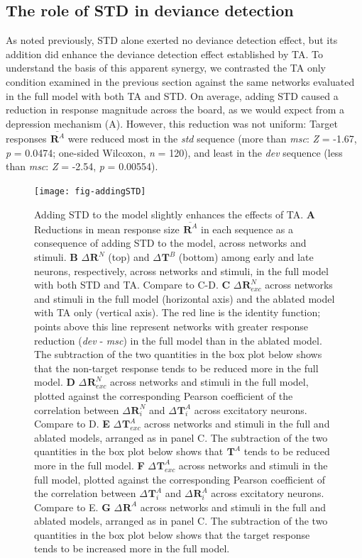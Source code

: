 \documentclass[9pt,lineno,onehalfspacing]{elife}
\newcommand{\dev}{\textit{dev}}
\newcommand{\msc}{\textit{msc}}
\newcommand{\std}{\textit{std}}
\newcommand{\R}[3][]{{}^{#1}_{}\boldsymbol R^{#2}_{#3}}
\newcommand{\T}[3][]{{}^{#1}_{}\boldsymbol T^{#2}_{#3}}
\newcommand{\mean}[1]{\overline{#1}}
\begin{document}
\subsection{The role of STD in deviance detection}\label{sec:std}

As noted previously, STD alone exerted no deviance detection effect, but its addition did enhance the deviance detection effect established by TA. To understand the basis of this apparent synergy, we contrasted the TA only condition examined in the previous section against the same networks evaluated in the full model with both TA and STD. On average, adding STD caused a reduction in response magnitude across the board, as we would expect from a depression mechanism (A). However, this reduction was not uniform: Target responses $\mean{\R{A}{}}$ were reduced most in the \std{} sequence (more than \msc{}: \textit{Z} = -1.67, \textit{p} = 0.0474; one-sided Wilcoxon, \textit{n} = 120), and least in the \dev{} sequence (less than \msc{}: \textit{Z} = -2.54, \textit{p} = 0.00554).

\begin{figure}
    \texttt{[image: fig-addingSTD]}
    \caption{%
        Adding STD to the model slightly enhances the effects of TA.
        \textbf{A} Reductions in mean response size $\mean{\R{A}{}}$ in each sequence as a consequence of adding STD to the model, across networks and stimuli.
        \textbf{B} $\Delta \R{N}{}$ (top) and $\Delta \T{B}{}$ (bottom) among early and late neurons, respectively, across networks and stimuli, in the full model with both STD and TA. Compare to C-D.
        \textbf{C} $\Delta \R{N}{exc}$ across networks and stimuli in the full model (horizontal axis) and the ablated model with TA only (vertical axis). The red line is the identity function; points above this line represent networks with greater response reduction (\dev{} - \msc{}) in the full model than in the ablated model. The subtraction of the two quantities in the box plot below shows that the non-target response tends to be reduced more in the full model.
        \textbf{D} $\Delta \R{N}{exc}$ across networks and stimuli in the full model, plotted against the corresponding Pearson coefficient of the correlation between $\Delta \R{N}{i}$ and $\Delta \T{A}{i}$ across excitatory neurons. Compare to D.
        \textbf{E} $\Delta \T{A}{exc}$ across networks and stimuli in the full and ablated models, arranged as in panel C. The subtraction of the two quantities in the box plot below shows that $\T{A}{}$ tends to be reduced more in the full model.
        \textbf{F} $\Delta \T{A}{exc}$ across networks and stimuli in the full model, plotted against the corresponding Pearson coefficient of the correlation between $\Delta \T{A}{i}$ and $\Delta \R{A}{i}$ across excitatory neurons. Compare to E.
        \textbf{G} $\Delta \R{A}{}$ across networks and stimuli in the full and ablated models, arranged as in panel C. The subtraction of the two quantities in the box plot below shows that the target response tends to be increased more in the full model.
    }
    \label{fig:addingSTD}
\end{figure}
\end{document}
